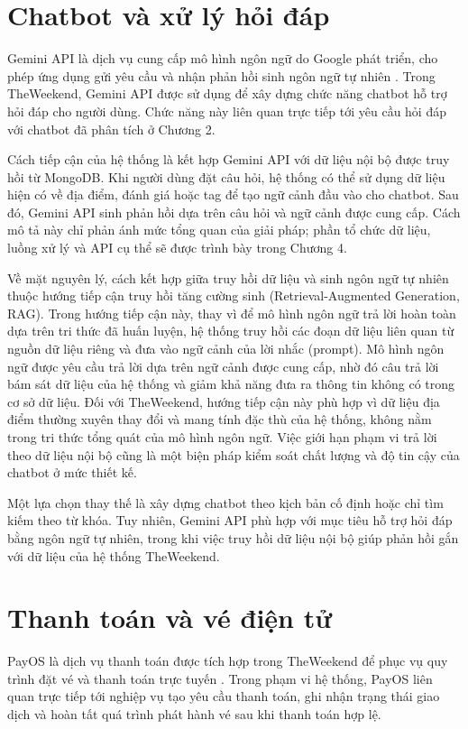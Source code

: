 \documentclass[../DoAn.tex]{subfiles}
\begin{document}
\section{Chatbot và xử lý hỏi đáp}

Gemini API là dịch vụ cung cấp mô hình ngôn ngữ do Google phát triển, cho phép ứng dụng gửi yêu cầu và nhận phản hồi sinh ngôn ngữ tự nhiên \cite{gemini_api_docs}. Trong TheWeekend, Gemini API được sử dụng để xây dựng chức năng chatbot hỗ trợ hỏi đáp cho người dùng. Chức năng này liên quan trực tiếp tới yêu cầu hỏi đáp với chatbot đã phân tích ở Chương 2.

Cách tiếp cận của hệ thống là kết hợp Gemini API với dữ liệu nội bộ được truy hồi từ MongoDB. Khi người dùng đặt câu hỏi, hệ thống có thể sử dụng dữ liệu hiện có về địa điểm, đánh giá hoặc tag để tạo ngữ cảnh đầu vào cho chatbot. Sau đó, Gemini API sinh phản hồi dựa trên câu hỏi và ngữ cảnh được cung cấp. Cách mô tả này chỉ phản ánh mức tổng quan của giải pháp; phần tổ chức dữ liệu, luồng xử lý và API cụ thể sẽ được trình bày trong Chương 4.

Về mặt nguyên lý, cách kết hợp giữa truy hồi dữ liệu và sinh ngôn ngữ tự nhiên thuộc hướng tiếp cận truy hồi tăng cường sinh (Retrieval-Augmented Generation, RAG). Trong hướng tiếp cận này, thay vì để mô hình ngôn ngữ trả lời hoàn toàn dựa trên tri thức đã huấn luyện, hệ thống truy hồi các đoạn dữ liệu liên quan từ nguồn dữ liệu riêng và đưa vào ngữ cảnh của lời nhắc (prompt). Mô hình ngôn ngữ được yêu cầu trả lời dựa trên ngữ cảnh được cung cấp, nhờ đó câu trả lời bám sát dữ liệu của hệ thống và giảm khả năng đưa ra thông tin không có trong cơ sở dữ liệu. Đối với TheWeekend, hướng tiếp cận này phù hợp vì dữ liệu địa điểm thường xuyên thay đổi và mang tính đặc thù của hệ thống, không nằm trong tri thức tổng quát của mô hình ngôn ngữ. Việc giới hạn phạm vi trả lời theo dữ liệu nội bộ cũng là một biện pháp kiểm soát chất lượng và độ tin cậy của chatbot ở mức thiết kế.

Một lựa chọn thay thế là xây dựng chatbot theo kịch bản cố định hoặc chỉ tìm kiếm theo từ khóa. Tuy nhiên, Gemini API phù hợp với mục tiêu hỗ trợ hỏi đáp bằng ngôn ngữ tự nhiên, trong khi việc truy hồi dữ liệu nội bộ giúp phản hồi gắn với dữ liệu của hệ thống TheWeekend.

\section{Thanh toán và vé điện tử}

PayOS là dịch vụ thanh toán được tích hợp trong TheWeekend để phục vụ quy trình đặt vé và thanh toán trực tuyến \cite{payos_docs}. Trong phạm vi hệ thống, PayOS liên quan trực tiếp tới nghiệp vụ tạo yêu cầu thanh toán, ghi nhận trạng thái giao dịch và hoàn tất quá trình phát hành vé sau khi thanh toán hợp lệ.
\end{document}
